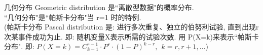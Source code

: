 \documentclass[UTF8]{ctexart}
\begin{document}
	
	
	
	几何分布 Geometric distribution 是``离散型数据"的概率分布. \\
	``几何分布"是``帕斯卡分布"当 r=1 时的特例. \\
	 (帕斯卡分布 Pascal distribution 是: 进行多次重复、独立的伯努利试验, 直到出现r次某事件成功为止. 即: 随机变量X表示所需的试验次数. 用 P(X=k)来表示``帕斯卡分布". 即: $P\left( X=k \right) =C_{k-1}^{r-1}\cdot P^r\cdot \left( 1-P \right) ^{k-r},\ \ k=r,r+1,...$) \\
	
	
	
	
	
	
	
	
\end{document}
